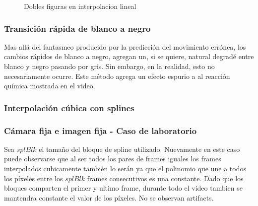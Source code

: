 \begin{figure}[H]
    \centering
    \caption{Dobles figuras en interpolacion lineal}
    \label{fig:artifact}
\end{figure}

\subsubsection*{Transición rápida de blanco a negro}
Mas allá del fantasmeo producido por la predicción del movimiento errónea, los cambios rápidos de blanco a negro, agregan un, si se quiere, natural degradé entre blanco y negro pasando por gris. Sin embargo, en la realidad, esto no necesariamente ocurre. Este método agrega un efecto espurio a al reacción química mostrada en el video.


\subsubsection{\bf{Interpolación cúbica con splines}}
\subsubsection*{Cámara fija e imagen fija - Caso de laboratorio}
Sea $splBlk$ el tamaño del bloque de spline utilizado. Nuevamente en este caso puede observarse que al ser todos los pares de frames iguales los frames interpolados cubicamente también lo serán ya que el polinomio que une a todos los píxeles entre los $splBlk$ frames consecutivos es una constante. Dado que los bloques comparten el primer y ultimo frame, durante todo el video tambien se mantendra constante el valor de los píxeles. No se observan artifacts.

